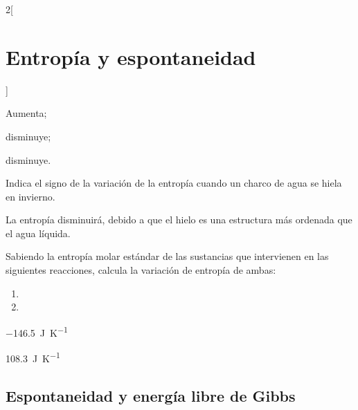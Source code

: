 \documentclass[10pt]{article}
\begin{document}
\begin{multicols}{2}[
  \section{Entropía y espontaneidad}
  ]
  \begin{solution}
    \begin{enumerate*}
      \item Aumenta;
      \item disminuye;
      \item disminuye.
    \end{enumerate*}
  \end{solution}



  \begin{exercise}[
      tags    = {termodinámica, entropía},
      topics  = {química, termoquímica, termodinámica},
      source  = {},
    ]
    Indica el signo de la variación de la entropía cuando un charco de agua se hiela en invierno.
  \end{exercise}

  \begin{solution}
    La entropía disminuirá, debido a que el hielo es una estructura más ordenada que el agua líquida.
  \end{solution}




  \begin{exercise}[
      tags    = {termodinámica, entropía},
      topics  = {química, termoquímica, termodinámica},
      source  = {},
    ]
    Sabiendo la entropía molar estándar de las sustancias que intervienen en las siguientes reacciones, calcula la variación de entropía de ambas:
    \begin{enumerate}
      \item {}
      \item {}
    \end{enumerate}
  \end{exercise}

  \begin{solution}
    \begin{enumerate*}
      \item \SI{-146.5}{\joule\per\kelvin}
      \item \SI{108.3}{\joule\per\kelvin}
    \end{enumerate*}
  \end{solution}




  \subsection{Espontaneidad y energía libre de Gibbs}


\end{multicols}
\end{document}
